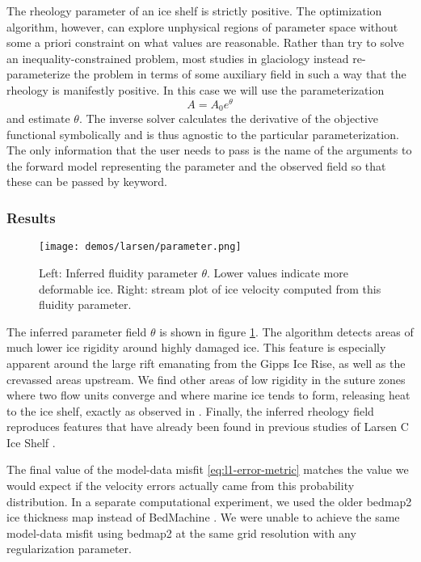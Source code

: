 \documentclass{article}
\theoremstyle{definition}
\theoremstyle{plain}
\begin{document}
The rheology parameter of an ice shelf is strictly positive.
The optimization algorithm, however, can explore unphysical regions of parameter space without some a priori constraint on what values are reasonable.
Rather than try to solve an inequality-constrained problem, most studies in glaciology instead re-parameterize the problem in terms of some auxiliary field in such a way that the rheology is manifestly positive.
In this case we will use the parameterization
\begin{equation}
    A = A_0e^{\theta}
\end{equation}
and estimate $\theta$.
The inverse solver calculates the derivative of the objective functional symbolically and is thus agnostic to the particular parameterization.
The only information that the user needs to pass is the name of the arguments to the forward model representing the parameter and the observed field so that these can be passed by keyword.


\subsubsection{Results}

\begin{figure}[h]
    \texttt{[image: demos/larsen/parameter.png]}
    \caption{Left: Inferred fluidity parameter $\theta$.
    Lower values indicate more deformable ice.
    Right: stream plot of ice velocity computed from this fluidity parameter.}
    \label{fig:larsen}
\end{figure}

The inferred parameter field $\theta$ is shown in figure \ref{fig:larsen}.
The algorithm detects areas of much lower ice rigidity around highly damaged ice.
This feature is especially apparent around the large rift emanating from the Gipps Ice Rise, as well as the crevassed areas upstream.
We find other areas of low rigidity in the suture zones where two flow units converge and where marine ice tends to form, releasing heat to the ice shelf, exactly as observed in \citet{holland2009marine}.
Finally, the inferred rheology field reproduces features that have already been found in previous studies of Larsen C Ice Shelf \citep{khazendar2011acceleration}.

The final value of the model-data misfit \eqref{eq:l1-error-metric} matches the value we would expect if the velocity errors actually came from this probability distribution.
In a separate computational experiment, we used the older bedmap2 ice thickness map instead of BedMachine \citep{fretwell2013bedmap2}.
We were unable to achieve the same model-data misfit using bedmap2 at the same grid resolution with any regularization parameter.
\end{document}
